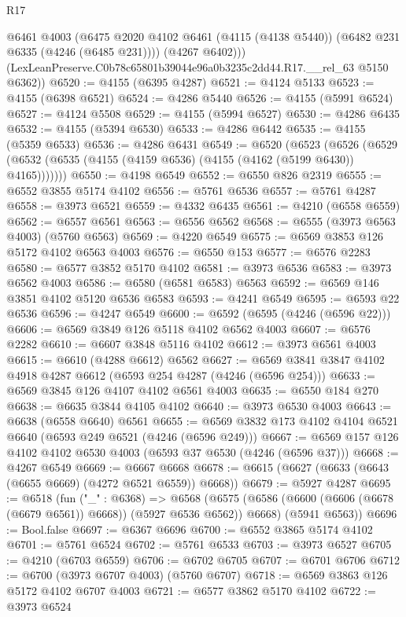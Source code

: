 \begin{lexlean}{R17}
\begin{coremodule}
          @6461
          @4003
          (@6475 @2020 @4102 @6461 (@4115 (@4138 @5440)) (@6482 @231 @6335 (@4246 (@6485 @231))))
          (@4267 @6402)))
      (LexLeanPreserve.C0b78c65801b39044e96a0b3235c2dd44.R17.__rel_63 @5150 @6362))
@6520 := @4155 (@6395 @4287)
@6521 := @4124 @5133
@6523 := @4155 (@6398 @6521)
@6524 := @4286 @5440
@6526 := @4155 (@5991 @6524)
@6527 := @4124 @5508
@6529 := @4155 (@5994 @6527)
@6530 := @4286 @6435
@6532 := @4155 (@5394 @6530)
@6533 := @4286 @6442
@6535 := @4155 (@5359 @6533)
@6536 := @4286 @6431
@6549 := @6520
    (@6523
      (@6526 (@6529 (@6532 (@6535 (@4155 (@4159 @6536) (@4155 (@4162 (@5199 @6430)) @4165)))))))
@6550 := @4198 @6549
@6552 := @6550 @826 @2319
@6555 := @6552 @3855 @5174 @4102
@6556 := @5761 @6536
@6557 := @5761 @4287
@6558 := @3973 @6521
@6559 := @4332 @6435
@6561 := @4210 (@6558 @6559)
@6562 := @6557 @6561
@6563 := @6556 @6562
@6568 := @6555 (@3973 @6563 @4003) (@5760 @6563)
@6569 := @4220 @6549
@6575 := @6569 @3853 @126 @5172 @4102 @6563 @4003
@6576 := @6550 @153
@6577 := @6576 @2283
@6580 := @6577 @3852 @5170 @4102
@6581 := @3973 @6536
@6583 := @3973 @6562 @4003
@6586 := @6580 (@6581 @6583) @6563
@6592 := @6569 @146 @3851 @4102 @5120 @6536 @6583
@6593 := @4241 @6549
@6595 := @6593 @22 @6536
@6596 := @4247 @6549
@6600 := @6592 (@6595 (@4246 (@6596 @22)))
@6606 := @6569 @3849 @126 @5118 @4102 @6562 @4003
@6607 := @6576 @2282
@6610 := @6607 @3848 @5116 @4102
@6612 := @3973 @6561 @4003
@6615 := @6610 (@4288 @6612) @6562
@6627 := @6569 @3841 @3847 @4102 @4918 @4287 @6612 (@6593 @254 @4287 (@4246 (@6596 @254)))
@6633 := @6569 @3845 @126 @4107 @4102 @6561 @4003
@6635 := @6550 @184 @270
@6638 := @6635 @3844 @4105 @4102
@6640 := @3973 @6530 @4003
@6643 := @6638 (@6558 @6640) @6561
@6655 := @6569 @3832 @173 @4102 @4104 @6521 @6640 (@6593 @249 @6521 (@4246 (@6596 @249)))
@6667 := @6569 @157 @126 @4102 @4102 @6530 @4003 (@6593 @37 @6530 (@4246 (@6596 @37)))
@6668 := @4267 @6549
@6669 := @6667 @6668
@6678 := @6615 (@6627 (@6633 (@6643 (@6655 @6669) (@4272 @6521 @6559)) @6668))
@6679 := @5927 @4287
@6695 := @6518
    (fun ("_" : @6368) =>
    @6568
      (@6575 (@6586 (@6600 (@6606 (@6678 (@6679 @6561)) @6668)) (@5927 @6536 @6562)) @6668)
      (@5941 @6563))
@6696 := Bool.false
@6697 := @6367 @6696
@6700 := @6552 @3865 @5174 @4102
@6701 := @5761 @6524
@6702 := @5761 @6533
@6703 := @3973 @6527
@6705 := @4210 (@6703 @6559)
@6706 := @6702 @6705
@6707 := @6701 @6706
@6712 := @6700 (@3973 @6707 @4003) (@5760 @6707)
@6718 := @6569 @3863 @126 @5172 @4102 @6707 @4003
@6721 := @6577 @3862 @5170 @4102
@6722 := @3973 @6524

\end{coremodule}
\end{lexlean}
